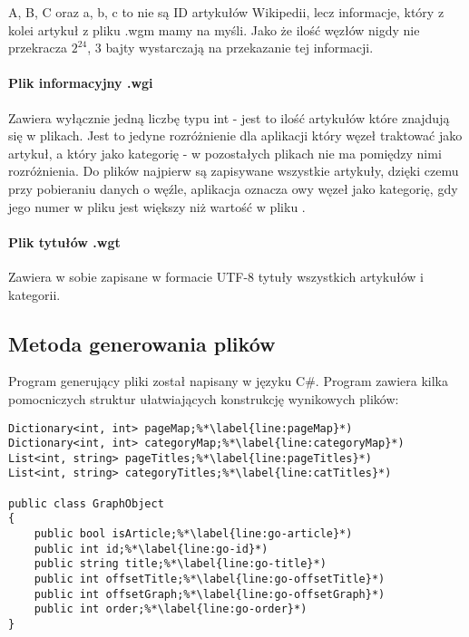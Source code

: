 
A, B, C oraz a, b, c to nie są ID artykułów Wikipedii, lecz informacje, który z kolei artykuł z pliku .wgm mamy na myśli. Jako że ilość węzłów nigdy nie przekracza $2^{24}$, 3 bajty wystarczają na przekazanie tej informacji.

\paragraph{Plik informacyjny .wgi}

Zawiera wyłącznie jedną liczbę typu int - jest to ilość artykułów które znajdują się w plikach. Jest to jedyne rozróżnienie dla aplikacji który węzeł traktować jako artykuł, a który jako kategorię - w pozostałych plikach nie ma pomiędzy nimi rozróżnienia. Do plików najpierw są zapisywane wszystkie artykuły, dzięki czemu przy pobieraniu danych o węźle, aplikacja oznacza owy węzeł jako kategorię, gdy jego numer w pliku  jest większy niż wartość w pliku . 

\paragraph{Plik tytułów .wgt}

Zawiera w sobie zapisane w formacie UTF-8 tytuły wszystkich artykułów i kategorii.

\subsection{Metoda generowania plików}

Program generujący pliki  został napisany w języku C\#.
Program zawiera kilka pomocniczych struktur ułatwiających konstrukcję wynikowych plików:

\begin{minipage}{\linewidth}
\begin{lstlisting}[caption={Pomocnicze struktury dla programu generującego pliki dla aplikacji}, label=lst:graph-object]
Dictionary<int, int> pageMap;%*\label{line:pageMap}*)
Dictionary<int, int> categoryMap;%*\label{line:categoryMap}*)
List<int, string> pageTitles;%*\label{line:pageTitles}*)
List<int, string> categoryTitles;%*\label{line:catTitles}*)

public class GraphObject
{
    public bool isArticle;%*\label{line:go-article}*)
    public int id;%*\label{line:go-id}*)
    public string title;%*\label{line:go-title}*)
    public int offsetTitle;%*\label{line:go-offsetTitle}*)
    public int offsetGraph;%*\label{line:go-offsetGraph}*)
    public int order;%*\label{line:go-order}*)
}
\end{lstlisting}
\end{minipage}

